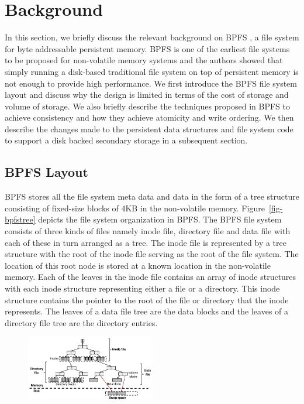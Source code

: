 \section{Background}
\label{sec-bg}
In this section, we briefly discuss the relevant background on BPFS \cite{c10}, a file system for byte addressable persistent memory. BPFS is one of the earliest file systems to be proposed for non-volatile memory systems and the authors showed that simply running a disk-based traditional file system on top of persistent memory is not enough to provide high performance. We first introduce the BPFS file system layout and discuss why the design is limited in terms of the cost of storage and volume of storage. We also briefly describe the techniques proposed in BPFS to achieve consistency and how they achieve atomicity and write ordering. We then describe the changes made to the persistent data structures and file system code to support a disk backed secondary storage in a subsequent section.

\subsection{BPFS Layout}
BPFS stores all the file system meta data and data in the form of a tree structure consisting of fixed-size blocks of 4KB in the non-volatile memory. Figure~\ref{fig-bpfstree} depicts the file system organization in BPFS. The BPFS file system consists of three kinds of files namely inode file, directory file and data file with each of these in turn arranged as a tree. The inode file is represented by a tree structure with the root of the inode file serving as the root of the file system. The location of this root node is stored at a known location in the non-volatile memory. Each of the leaves in the inode file contains an array of inode structures with each inode structure representing either a file or a directory. This inode structure contains the pointer to the root of the file or directory that the inode represents. The leaves of a data file tree are the data blocks and the leaves of a directory file tree are the directory entries.

\begin{figure}
\centering
\vspace{-0.2in}
\includegraphics[width=0.5\textwidth]{figs/bpfs2.pdf}
\vspace{-0.2in}
\end{figure}

